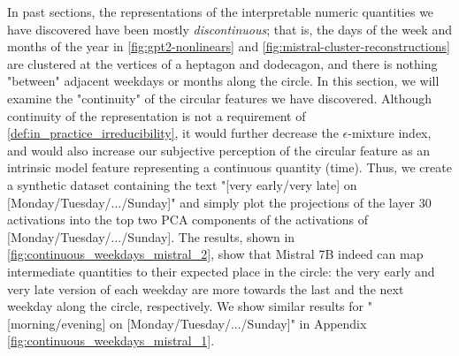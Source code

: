 \documentclass{article} %
\DeclareRobustCommand{\revOne}[1]{#1}
\theoremstyle{plain}
\theoremstyle{definition}
\begin{document}
In past sections, the representations of the interpretable numeric quantities we have discovered have been mostly \textit{discontinuous}; that is, the days of the week and months of the year in \cref{fig:gpt2-nonlinears} and \cref{fig:mistral-cluster-reconstructions} are clustered at the vertices of a heptagon and dodecagon, and there is nothing "between" adjacent weekdays or months along the circle. \revOne{In this section, we will examine the "continuity" of the circular features we have discovered.} Although continuity of the representation is not a requirement of \cref{def:in_practice_irreducibility}, 
it would further decrease the $\epsilon$-mixture index, and would also increase our subjective perception of the circular feature as an intrinsic model feature representing a continuous quantity (time). Thus, we create a synthetic dataset containing the text "[very early/very late] on [Monday/Tuesday/.../Sunday]" and simply plot the projections of the layer $30$ activations into the top two PCA components of the activations of [Monday/Tuesday/.../Sunday]. The results, shown in \cref{fig:continuous_weekdays_mistral_2}, show that Mistral 7B indeed can map intermediate quantities to their expected place in the circle: the very early and very late version of each weekday are more towards the last and the next weekday along the circle, respectively. We show similar results for "[morning/evening] on [Monday/Tuesday/.../Sunday]" in Appendix \cref{fig:continuous_weekdays_mistral_1}.







\end{document}
